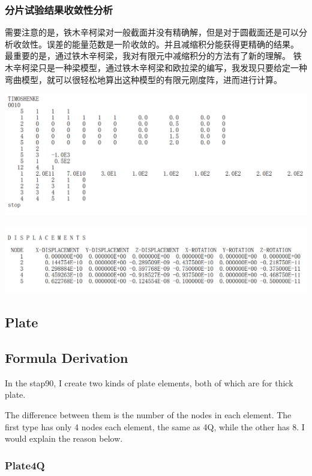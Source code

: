 \documentclass[UTF8]{ctexbook}
\begin{document}
\subsubsection{分片试验结果收敛性分析}
需要注意的是，铁木辛柯梁对一般截面并没有精确解，但是对于圆截面还是可以分析收敛性。误差的能量范数是一阶收敛的。并且减缩积分能获得更精确的结果。
最重要的是，通过铁木辛柯梁，我对有限元中减缩积分的方法有了新的理解。
铁木辛柯梁只是一种梁模型，通过铁木辛柯梁和欧拉梁的编写，我发现只要给定一种弯曲模型，就可以很轻松地算出这种模型的有限元刚度阵，进而进行计算。
\begin{center}
\includegraphics[width=1.0\textwidth]{timoshenko2.png}
\end{center}
\begin{center}
\includegraphics[width=1.0\textwidth]{timoshenko3.png}
\end{center}
\subsection{Plate}

    \subsection{Formula Derivation}
    In the stap90, I create two kinds of plate elements, both of which are for thick plate.

    The difference between them is the number of the nodes in each element. The first type has only 4 nodes
    each element, the same as 4Q, while the other has 8. I would explain the reason below.
    \subsubsection{Plate4Q}
    
\end{document}
